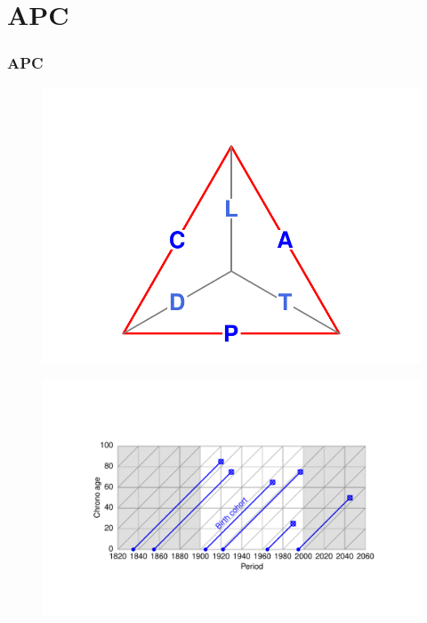 \documentclass[20pt]{beamer}
\begin{document}
\section{APC}
\begin{frame}
\frametitle{APC}
\vspace{-6em}
\begin{figure}
\raggedleft
    \includegraphics[scale=.7]{Figures/TetraAPCprg.pdf}
\end{figure}
\vspace{-3em}
\begin{figure}[b]
    \centering
    \includegraphics{Figures/LabPres/APC4.pdf}
\end{figure} 
\end{frame}
\end{document}
